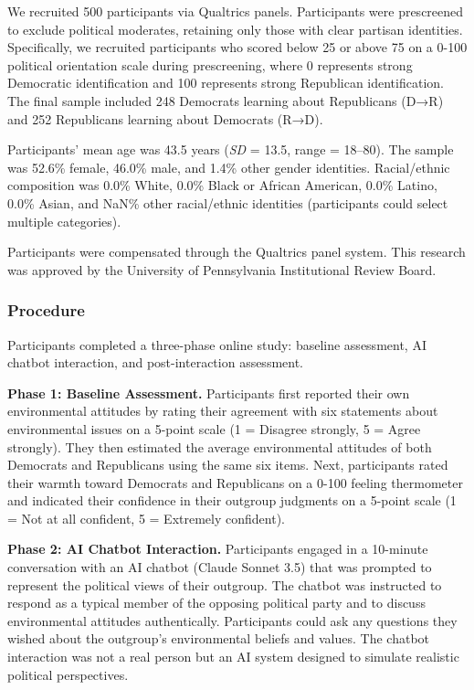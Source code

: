 \documentclass[
  11pt,
  oneside]{article}
\begin{document}
We recruited 500 participants via Qualtrics panels. Participants were
prescreened to exclude political moderates, retaining only those with
clear partisan identities. Specifically, we recruited participants who
scored below 25 or above 75 on a 0-100 political orientation scale
during prescreening, where 0 represents strong Democratic identification
and 100 represents strong Republican identification. The final sample
included 248 Democrats learning about Republicans (D→R) and 252
Republicans learning about Democrats (R→D).

Participants' mean age was 43.5 years (\emph{SD} = 13.5, range =
18--80). The sample was 52.6\% female, 46.0\% male, and 1.4\% other
gender identities. Racial/ethnic composition was 0.0\% White, 0.0\%
Black or African American, 0.0\% Latino, 0.0\% Asian, and NaN\% other
racial/ethnic identities (participants could select multiple
categories).

Participants were compensated through the Qualtrics panel system. This
research was approved by the University of Pennsylvania Institutional
Review Board.

\subsubsection{Procedure}\label{procedure}

Participants completed a three-phase online study: baseline assessment,
AI chatbot interaction, and post-interaction assessment.

\textbf{Phase 1: Baseline Assessment.} Participants first reported their
own environmental attitudes by rating their agreement with six
statements about environmental issues on a 5-point scale (1 = Disagree
strongly, 5 = Agree strongly). They then estimated the average
environmental attitudes of both Democrats and Republicans using the same
six items. Next, participants rated their warmth toward Democrats and
Republicans on a 0-100 feeling thermometer and indicated their
confidence in their outgroup judgments on a 5-point scale (1 = Not at
all confident, 5 = Extremely confident).

\textbf{Phase 2: AI Chatbot Interaction.} Participants engaged in a
10-minute conversation with an AI chatbot (Claude Sonnet 3.5) that was
prompted to represent the political views of their outgroup. The chatbot
was instructed to respond as a typical member of the opposing political
party and to discuss environmental attitudes authentically. Participants
could ask any questions they wished about the outgroup's environmental
beliefs and values. The chatbot interaction was not a real person but an
AI system designed to simulate realistic political perspectives.
\end{document}
